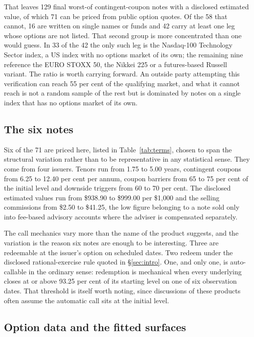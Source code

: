 That leaves 129 final worst-of contingent-coupon notes with a disclosed
estimated value, of which 71 can be priced from public option quotes. Of the 58
that cannot, 16 are written on single names or funds and 42 carry at least one
leg whose options are not listed. That second group is more concentrated than
one would guess. In 33 of the 42 the only such leg is the Nasdaq-100 Technology
Sector index, a US index with no options market of its own; the remaining nine
reference the EURO STOXX 50, the Nikkei 225 or a futures-based Russell variant.
The ratio is worth carrying forward. An outside party attempting this
verification can reach 55 per cent of the qualifying market, and what it cannot
reach is not a random sample of the rest but is dominated by notes on a
single index that has no options market of its own.

\subsection{The six notes}



Six of the 71 are priced here, listed in Table~\ref{tab:terms}, chosen to span
the structural variation rather than to be representative in any statistical
sense. They come from four issuers. Tenors run from 1.75 to 5.00 years, contingent
coupons from 6.25 to 12.40 per cent per annum, coupon barriers from 65 to 75
per cent of the initial level and downside triggers from 60 to 70 per cent. The
disclosed estimated values run from \$938.90 to \$999.00 per \$1{,}000 and the
selling commissions from \$2.50 to \$41.25, the low figure belonging to a note
sold only into fee-based advisory accounts where the adviser is compensated
separately.

The call mechanics vary more than the name of the product suggests, and the
variation is the reason six notes are enough to be interesting. Three are
redeemable at the issuer's option on scheduled dates. Two redeem under the
disclosed rational-exercise rule quoted in \S\ref{sec:intro}. One, and only
one, is auto-callable in the ordinary sense: redemption is mechanical when every
underlying closes at or above 93.25 per cent of its starting level on one of
six observation dates. That threshold is itself worth noting, since discussions
of these products often assume the automatic call sits at the initial level.

\subsection{Option data and the fitted surfaces}

